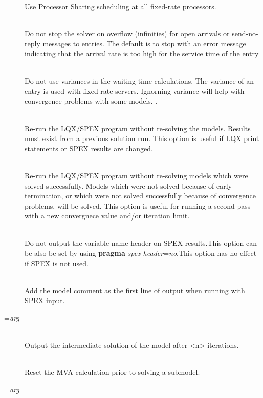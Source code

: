 \begin{description}
\item[]~\\
Use Processor Sharing scheduling at all fixed-rate processors.
\item[]~\\
Do not stop the solver on overflow (infinities) for open arrivals or send-no-reply messages to entries.  The default is to stop with an
error message indicating that the arrival rate is too high for the service time of the entry
\item[]~\\
Do not use variances in the waiting time calculations.
The variance of an entry is used with fixed-rate servers.
Ignorning variance will help with convergence problems with some models. .
\item[]~\\
Re-run the LQX/SPEX program without re-solving the models.  Results must exist from a previous solution run.
This option is useful if LQX print statements or SPEX results are changed.
\item[]~\\
Re-run the LQX/SPEX program without re-solving models which were solved successfully.  Models which were not solved because of early termination, or which were not solved successfully because of convergence problems, will be solved.
This option is useful for running a second pass with a new convergnece value and/or iteration limit.
\item[]~\\
Do not output the variable name header on SPEX results.This option can be also be set by using \textbf{pragma} \emph{spex-header}=\emph{no}.This option has no effect if SPEX is not used.
\item[]~\\
Add the model comment as the first line of output when running with SPEX input.
\item[=\emph{arg}]~\\
Output the intermediate solution of the model after <n> iterations.
\item[]~\\
Reset the MVA calculation prior to solving a submodel.
\item[=\emph{arg}]~\\

\end{description}
